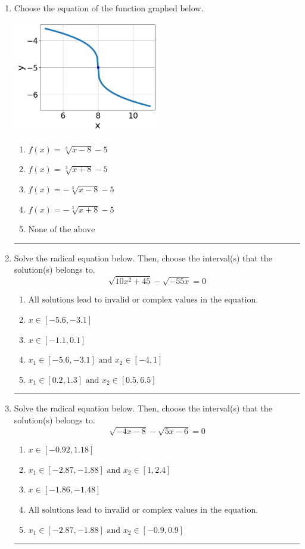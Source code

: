\documentclass[14pt]{extbook}
\newcommand{\litem}[1]{\item#1\hspace*{-1cm}\rule{\textwidth}{0.4pt}}
\begin{document}
\begin{enumerate}
{\begin{enumerate}[label=\Alph*.]
\end{enumerate} }
\litem{
Choose the equation of the function graphed below.
\begin{center}
    \includegraphics[width=0.5\textwidth]{../Figures/radicalGraphToEquationC.png}
\end{center}
\begin{enumerate}[label=\Alph*.]
\item \( f(x) = \sqrt[3]{x - 8} - 5 \)
\item \( f(x) = \sqrt[3]{x + 8} - 5 \)
\item \( f(x) = - \sqrt[3]{x - 8} - 5 \)
\item \( f(x) = - \sqrt[3]{x + 8} - 5 \)
\item \( \text{None of the above} \)

\end{enumerate} }
\litem{
Solve the radical equation below. Then, choose the interval(s) that the solution(s) belongs to.\[ \sqrt{10 x^2 + 45} - \sqrt{-55 x} = 0 \]\begin{enumerate}[label=\Alph*.]
\item \( \text{All solutions lead to invalid or complex values in the equation.} \)
\item \( x \in [-5.6,-3.1] \)
\item \( x \in [-1.1,0.1] \)
\item \( x_1 \in [-5.6, -3.1] \text{ and } x_2 \in [-4,1] \)
\item \( x_1 \in [0.2, 1.3] \text{ and } x_2 \in [0.5,6.5] \)

\end{enumerate} }
\litem{
Solve the radical equation below. Then, choose the interval(s) that the solution(s) belongs to.\[ \sqrt{-4 x - 8} - \sqrt{5 x - 6} = 0 \]\begin{enumerate}[label=\Alph*.]
\item \( x \in [-0.92,1.18] \)
\item \( x_1 \in [-2.87, -1.88] \text{ and } x_2 \in [1,2.4] \)
\item \( x \in [-1.86,-1.48] \)
\item \( \text{All solutions lead to invalid or complex values in the equation.} \)
\item \( x_1 \in [-2.87, -1.88] \text{ and } x_2 \in [-0.9,0.9] \)


\end{enumerate}}
\end{enumerate}
\end{document}

